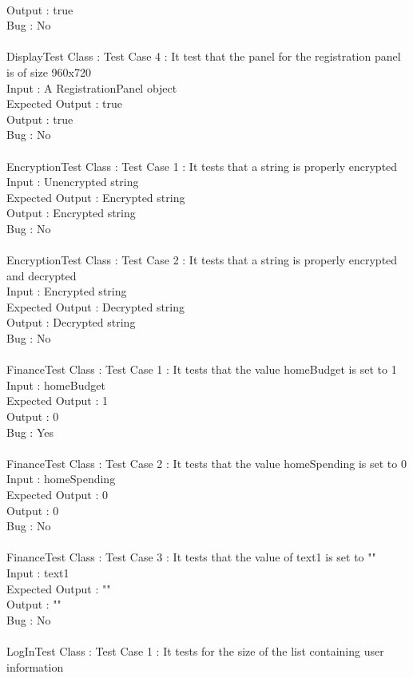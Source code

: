 \documentclass{article}
\begin{document}
\\Output : true
\\Bug : No
\\\\DisplayTest Class : Test Case 4 : It test that the panel for the registration panel is of size 960x720
\\Input : A RegistrationPanel object
\\Expected Output : true
\\Output : true
\\Bug : No
\\\\EncryptionTest Class : Test Case 1 : It tests that a string is properly encrypted
\\Input : Unencrypted string
\\Expected Output : Encrypted string
\\Output : Encrypted string
\\Bug : No
\\\\EncryptionTest Class : Test Case 2 : It tests that a string is properly encrypted and decrypted
\\Input : Encrypted string
\\Expected Output : Decrypted string
\\Output : Decrypted string
\\Bug : No
\\\\FinanceTest Class : Test Case 1 : It tests that the value homeBudget is set to 1
\\Input : homeBudget
\\Expected Output : 1
\\Output : 0
\\Bug : Yes
\\\\FinanceTest Class : Test Case 2 : It tests that the value homeSpending is set to 0
\\Input : homeSpending
\\Expected Output : 0
\\Output : 0
\\Bug : No
\\\\FinanceTest Class : Test Case 3 : It tests that the value of text1 is set to ""
\\Input : text1
\\Expected Output : ""
\\Output : ""
\\Bug : No
\\\\LogInTest Class : Test Case 1 : It tests for the size of the list containing user information
\end{document}
